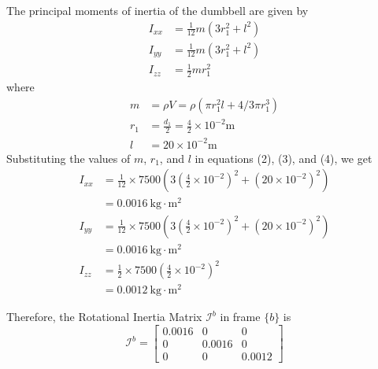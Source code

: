 The principal moments of inertia of the dumbbell are given by
\begin{align}
    I_{xx} & =\frac{1}{12} m\left(3 r_{1}^{2}+l^{2}\right) \\
    I_{yy} & =\frac{1}{12} m\left(3 r_{1}^{2}+l^{2}\right) \\
    I_{zz} & =\frac{1}{2} m r_{1}^{2}
\end{align}
where
\begin{align*}
    m     & =\rho V=\rho\left(\pi r_{1}^{2} l+4 / 3 \pi r_{1}^{3}\right) \\
    r_{1} & =\frac{d_{1}}{2}=\frac{4}{2} \times 10^{-2} \mathrm{m}       \\
    l     & =20 \times 10^{-2} \mathrm{m}
\end{align*}
Substituting the values of \( m \), \( r_{1} \), and \( l \) in equations (2), (3), and (4), we get
\begin{align*}
    I_{xx} & =\frac{1}{12} \times 7500\left(3\left(\frac{4}{2} \times 10^{-2}\right)^{2}+\left(20 \times 10^{-2}\right)^{2}\right) \\
           & =0.0016 \mathrm{~kg} \cdot \mathrm{m}^{2}                                                                             \\
    I_{yy} & =\frac{1}{12} \times 7500\left(3\left(\frac{4}{2} \times 10^{-2}\right)^{2}+\left(20 \times 10^{-2}\right)^{2}\right) \\
           & =0.0016 \mathrm{~kg} \cdot \mathrm{m}^{2}                                                                             \\
    I_{zz} & =\frac{1}{2} \times 7500\left(\frac{4}{2} \times 10^{-2}\right)^{2}                                                   \\
           & =0.0012 \mathrm{~kg} \cdot \mathrm{m}^{2}
\end{align*}

Therefore, the Rotational Inertia Matrix \( \mathcal{I}^{b} \) in frame \( \{b\} \) is
\begin{equation}
    \mathcal{I}^{b}=\begin{bmatrix}
        0.0016 & 0      & 0      \\
        0      & 0.0016 & 0      \\
        0      & 0      & 0.0012
    \end{bmatrix}
\end{equation}
